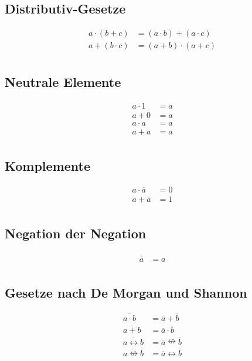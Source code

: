 \subsection*{Distributiv-Gesetze}
\begin{align*}
	a \cdot (b + c) & = (a \cdot b) + (a \cdot c) \\
	a + (b \cdot c) & = (a + b) \cdot (a + c) \\
\end{align*}

\subsection*{Neutrale Elemente}
\begin{align*}
	a \cdot 1 & = a \\
		a + 0 & = a \\
	a \cdot a & = a \\
		a + a & = a \\
\end{align*}

\subsection*{Komplemente}
\begin{align*}
	a \cdot \overline{a} & = 0 \\
		a + \overline{a} & = 1 \\
\end{align*}

\subsection*{Negation der Negation}
\begin{align*}
	\overline{\overline{a}} & = a \\
\end{align*}

\subsection*{Gesetze nach De Morgan und Shannon}
\begin{align*}
	\overline{a \cdot b} & = \overline a + \overline b \\
	\overline{a + b} & = \overline a \cdot \overline b \\
	\overline{a \leftrightarrow b} 
		& = \overline a \nleftrightarrow \overline b \\
	\overline{a \nleftrightarrow b} 
		& = \overline a \leftrightarrow \overline b \\
\end{align*}

